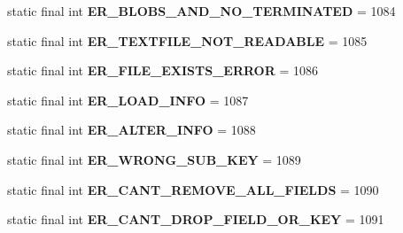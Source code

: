 \begin{DoxyCompactItemize}
static final int {\bfseries E\+R\+\_\+\+B\+L\+O\+B\+S\+\_\+\+A\+N\+D\+\_\+\+N\+O\+\_\+\+T\+E\+R\+M\+I\+N\+A\+T\+ED} = 1084
\item 
\mbox{\label{classcom_1_1mysql_1_1jdbc_1_1_mysql_error_numbers_aa4cee6c24ba39c7e75a8b95576e382f7}} 
static final int {\bfseries E\+R\+\_\+\+T\+E\+X\+T\+F\+I\+L\+E\+\_\+\+N\+O\+T\+\_\+\+R\+E\+A\+D\+A\+B\+LE} = 1085
\item 
\mbox{\label{classcom_1_1mysql_1_1jdbc_1_1_mysql_error_numbers_a8425739ca252ebb65df8df97c9d3f918}} 
static final int {\bfseries E\+R\+\_\+\+F\+I\+L\+E\+\_\+\+E\+X\+I\+S\+T\+S\+\_\+\+E\+R\+R\+OR} = 1086
\item 
\mbox{\label{classcom_1_1mysql_1_1jdbc_1_1_mysql_error_numbers_a704f73930788ad575eb4e3ed618afd82}} 
static final int {\bfseries E\+R\+\_\+\+L\+O\+A\+D\+\_\+\+I\+N\+FO} = 1087
\item 
\mbox{\label{classcom_1_1mysql_1_1jdbc_1_1_mysql_error_numbers_aa9ce315541d4071c36a38500021748d0}} 
static final int {\bfseries E\+R\+\_\+\+A\+L\+T\+E\+R\+\_\+\+I\+N\+FO} = 1088
\item 
\mbox{\label{classcom_1_1mysql_1_1jdbc_1_1_mysql_error_numbers_adf24d05f45b4836384b0f242c5affb89}} 
static final int {\bfseries E\+R\+\_\+\+W\+R\+O\+N\+G\+\_\+\+S\+U\+B\+\_\+\+K\+EY} = 1089
\item 
\mbox{\label{classcom_1_1mysql_1_1jdbc_1_1_mysql_error_numbers_a946b0a165c33cf1457ccdf7ac0114e03}} 
static final int {\bfseries E\+R\+\_\+\+C\+A\+N\+T\+\_\+\+R\+E\+M\+O\+V\+E\+\_\+\+A\+L\+L\+\_\+\+F\+I\+E\+L\+DS} = 1090
\item 
\mbox{\label{classcom_1_1mysql_1_1jdbc_1_1_mysql_error_numbers_a2d3e61a338ab9ab62d546045656fd9b8}} 
static final int {\bfseries E\+R\+\_\+\+C\+A\+N\+T\+\_\+\+D\+R\+O\+P\+\_\+\+F\+I\+E\+L\+D\+\_\+\+O\+R\+\_\+\+K\+EY} = 1091
\item 
\mbox{\label{classcom_1_1mysql_1_1jdbc_1_1_mysql_error_numbers_a53024cf7fc5648ec8f05fc541f31a818}} 

\end{DoxyCompactItemize}

